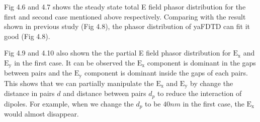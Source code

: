 Fig 4.6 and 4.7 shows the steady state total E field phasor distribution for the first and second case mentioned above
respectively. Comparing with the result shown in previous study (Fig 4.8), the phasor distribution of yaFDTD can fit it
good (Fig 4.8).

Fig 4.9 and 4.10 also shown the the partial E field phasor distribution for $\mathrm{E_x}$ and $\mathrm{E_y}$ in the
first case. It can be observed the $\mathrm{E_x}$ component is dominant in the gaps between pairs and the $\mathrm{E_y}$
component is dominant inside the gaps of each pairs. This shows that we can partially manipulate the $\mathrm{E_x}$ and
$\mathrm{E_y}$ by change the distance in pairs $d$ and distance between pairs $d_p$ to reduce the interaction of
dipoles.  For example, when we change the $d_p$ to be $40 nm$ in the first case, the $\mathrm{E_x}$ would almost
disappear.
